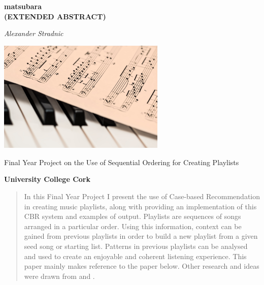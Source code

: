 \documentclass[a4paper, 12pt]{report}
\begin{document}
\begin{titlepage}
    \begin{center}
        \vspace*{1cm}

        \huge
        \textbf{matsubara\\ (EXTENDED ABSTRACT)}

        \vspace{1cm}

        \textit{Alexander Stradnic}

        \vspace{3cm}

        \includegraphics[width=0.6\textwidth]{"piano.jpg"}

        \vfill

        \textsf{Final Year Project on the Use of Sequential Ordering for Creating Playlists}

        \vspace{1cm}

        \textbf{University College Cork}

        \vspace*{1cm}

    \end{center}
\end{titlepage}

\begin{abstract}
In this Final Year Project I present the use of Case-based Recommendation in creating music playlists, 
along with providing an implementation of this CBR system and examples of output.
Playlists are sequences of songs arranged in a particular order. Using this information, 
context can be gained from previous playlists in order to build a new playlist from a given seed song or starting list. 
Patterns in previous playlists can be analysed and used to create an enjoyable and coherent listening experience.
This paper mainly makes reference to the paper below\cite{main}. 
Other research and ideas were drawn from \cite{constructive-adaptation} and \cite{cbr-general}.
\end{abstract}
\end{document}
